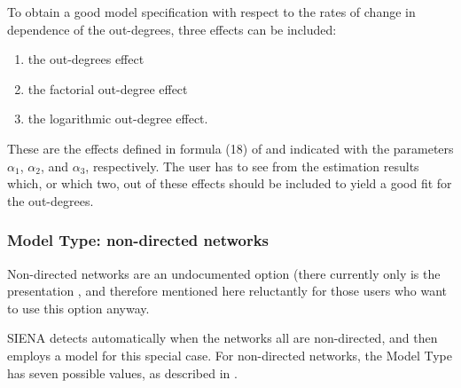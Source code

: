 \documentclass[a4paper,fleqn]{article}
\newcommand{\+}{\, + \,}
\newcommand{\SI}{{\sf SIENA }}
\begin{document}
{To obtain a good model specification with respect to the rates of
change in dependence of the out-degrees, three effects can be
included:
\begin{enumerate}
\item the out-degrees effect
\item the factorial out-degree effect
\item the logarithmic out-degree effect.
\end{enumerate}
These are the effects defined in formula (18) of \citet{Snijders03}
and indicated with the parameters $\alpha_1$, $\alpha_2$,
and $\alpha_3$, respectively.
The user has to see from the estimation results which, or which two,
out of these effects
should be included to yield a good fit for the out-degrees.
\medskip
\fi

\iffalse
\subsubsection{Model Type: non-directed networks}
\label{S_modeltype_nd}

Non-directed networks are an undocumented option (there currently
only is the presentation \citet{Snijders07}, and therefore
mentioned here reluctantly for those users who want to use
this option anyway.

\SI detects automatically when the networks all are non-directed, and then employs a model for this
special case. For non-directed networks, the Model Type has seven possible values,
as described in \citet{Snijders07}.

}
\end{document}
